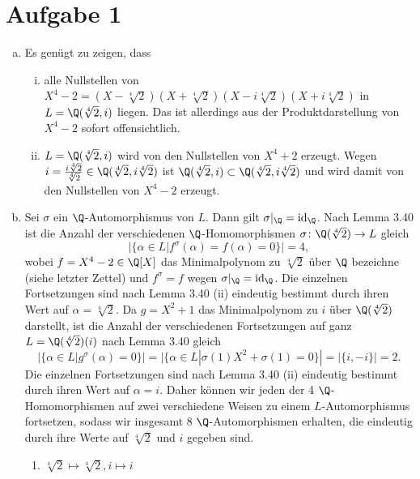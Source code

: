 \documentclass{article}
\begin{document}
\def\headheight{25pt}
    \section*{Aufgabe 1}
    \begin{enumerate}[(a)]
        \item Es genügt zu zeigen, dass 
        \begin{enumerate}[(i)]
            \item alle Nullstellen von $X^4 - 2 = (X - \sqrt[4]{2})(X + \sqrt[4]{2})(X - i\sqrt[4]{2})(X + i\sqrt[4]{2})$ in $L = \Q(\sqrt[4]{2}, i)$ liegen. Das ist allerdings aus der Produktdarstellung von $X^4 - 2$ sofort offensichtlich.
            \item $L = \Q(\sqrt[4]{2}, i)$ wird von den Nullstellen von $X^4 + 2$ erzeugt. Wegen $i = \frac{i \sqrt[4]{2}}{\sqrt[4]{2}} \in \Q(\sqrt[4]{2}, i\sqrt[4]{2})$ ist $\Q(\sqrt[4]{2}, i) \subset \Q(\sqrt[4]{2}, i\sqrt[4]{2})$ und wird damit von den Nullstellen von $X^4 - 2$ erzeugt. 
        \end{enumerate}
        \item Sei $\sigma$ ein $\Q$-Automorphismus von $L$. Dann gilt $\sigma|_\Q = \operatorname{id}_\Q$. 
        Nach Lemma 3.40 ist die Anzahl der verschiedenen $\Q$-Homomorphismen $\sigma\colon \Q(\sqrt[4]{2}) \to L$ gleich 
        \[|\{\alpha \in L | f^\sigma(\alpha) = f(\alpha)= 0\}| = 4,\]
        wobei $f = X^4 - 2 \in \Q[X]$ das Minimalpolynom zu $\sqrt[4]{2}$ über $\Q$ bezeichne (siehe letzter Zettel) und $f^\sigma = f$ wegen $\sigma|_\Q = \operatorname{id}_\Q$. 
        Die einzelnen Fortsetzungen sind nach Lemma 3.40 (ii) eindeutig bestimmt durch ihren Wert auf $\alpha = \sqrt[4]{2}$.
        Da $g = X^2 + 1$ das Minimalpolynom zu $i$ über $\Q(\sqrt[4]{2})$ darstellt, ist die Anzahl der verschiedenen Fortsetzungen auf ganz $L = \Q(\sqrt[4]{2})(i)$ nach Lemma 3.40 gleich 
        \[
            |\{\alpha \in L | g^\sigma(\alpha) = 0\}| = |\{\alpha \in L | \sigma(1)X^2 + \sigma(1) = 0\}| = |\{i, -i\}| = 2.   
        \]
        Die einzelnen Fortsetzungen sind nach Lemma 3.40 (ii) eindeutig bestimmt durch ihren Wert auf $\alpha = i$.
        Daher können wir jeden der 4 $\Q$-Homomorphismen auf zwei verschiedene Weisen zu einem $L$-Automorphismus fortsetzen, 
        sodass wir insgesamt $8$ $\Q$-Automorphismen erhalten, die eindeutig durch ihre Werte auf $\sqrt[4]{2}$ und $i$ gegeben sind.
        \begin{enumerate}[1.]
            \item $\sqrt[4]{2} \mapsto \sqrt[4]{2}, i \mapsto i$

\end{enumerate}
\end{enumerate}
\end{document}
